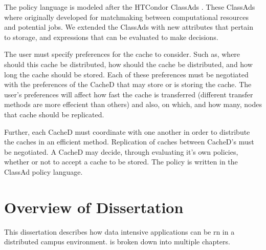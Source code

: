 The policy language is modeled after the HTCondor ClassAds \cite{raman1998matchmaking}.  These ClassAds where originally developed for matchmaking between computational resources and potential jobs.  We extended the ClassAds with new attributes that pertain to storage, and expressions that can be evaluated to make decisions.

The user must specify preferences for the cache to consider.  Such as, where should this cache be distributed, how should the cache be distributed, and how long the cache should be stored.  Each of these preferences must be negotiated with the preferences of the CacheD that may store or is storing the cache.  The user's preferences will affect how fast the cache is transferred (different transfer methods are more effecient than others) and also, on which, and how many, nodes that cache should be replicated.

Further, each CacheD must coordinate with one another in order to distribute the caches in an efficient method.  Replication of caches between CacheD's must be negotiated.  A CacheD may decide, through evaluating it's own policies, whether or not to accept a cache to be stored.  The policy is written in the ClassAd policy language.



\section{Overview of Dissertation}

This dissertation describes how data intensive applications can be rn in a distributed campus environment.   is broken down into multiple chapters.  

